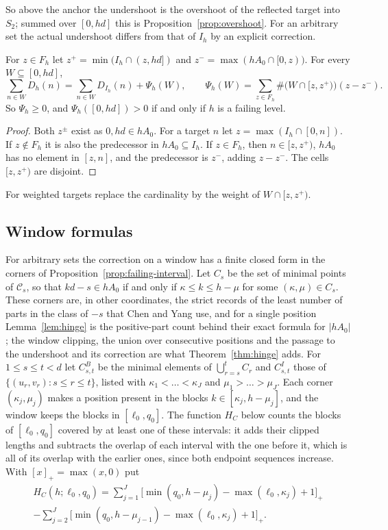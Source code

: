 So above the anchor the undershoot is the overshoot of the reflected target into $S_2$; summed over $[0,hd]$ this is Proposition~\ref{prop:overshoot}. For an arbitrary set the actual undershoot differs from that of $I_h$ by an explicit correction.

\begin{proposition}[Correction]\label{prop:correction}
For $z\in F_h$ let $z^+=\min(I_h\cap(z,hd])$ and $z^-=\max(hA_0\cap[0,z))$. For every $W\subseteq[0,hd]$,
\[
\sum_{n\in W}D_h(n)=\sum_{n\in W}D_{I_h}(n)+\Psi_h(W),\qquad \Psi_h(W)=\sum_{z\in F_h}\#\bigl(W\cap[z,z^+)\bigr)(z-z^-).
\]
So $\Psi_h\ge0$, and $\Psi_h([0,hd])>0$ if and only if $h$ is a failing level.
\end{proposition}

\begin{proof}
Both $z^\pm$ exist as $0,hd\in hA_0$. For a target $n$ let $z=\max(I_h\cap[0,n])$. If $z\notin F_h$ it is also the predecessor in $hA_0\subseteq I_h$. If $z\in F_h$, then $n\in[z,z^+)$, $hA_0$ has no element in $[z,n]$, and the predecessor is $z^-$, adding $z-z^-$. The cells $[z,z^+)$ are disjoint.
\end{proof}

For weighted targets replace the cardinality by the weight of $W\cap[z,z^+)$.

\subsection{Window formulas}\label{subsec:overlap}

For arbitrary sets the correction on a window has a finite closed form in the corners of Proposition~\ref{prop:failing-interval}. Let $C_s$ be the set of minimal points of $\mathcal C_s$, so that $kd-s\in hA_0$ if and only if $\kappa\le k\le h-\mu$ for some $(\kappa,\mu)\in C_s$. These corners are, in other coordinates, the strict records of the least number of parts in the class of $-s$ that Chen and Yang use, and for a single position Lemma~\ref{lem:hinge} is the positive-part count behind their exact formula for $|hA_0|$ \cite[Lemma~2, Thm.~1]{ChenYang2026}; the window clipping, the union over consecutive positions and the passage to the undershoot and its correction are what Theorem~\ref{thm:hinge} adds. For $1\le s\le t<d$ let $C^B_{s,t}$ be the minimal elements of $\bigcup_{r=s}^tC_r$ and $C^I_{s,t}$ those of $\{(u_r,v_r):s\le r\le t\}$, listed with $\kappa_1<\dots<\kappa_J$ and $\mu_1>\dots>\mu_J$. Each corner $(\kappa_j,\mu_j)$ makes a position present in the blocks $k\in[\kappa_j,h-\mu_j]$, and the window keeps the blocks in $[\ell_0,q_0]$. The function $H_C$ below counts the blocks of $[\ell_0,q_0]$ covered by at least one of these intervals: it adds their clipped lengths and subtracts the overlap of each interval with the one before it, which is all of its overlap with the earlier ones, since both endpoint sequences increase. With $[x]_+=\max(x,0)$ put
\begin{multline*}
H_C(h;\ell_0,q_0)=\sum_{j=1}^{J}\bigl[\min(q_0,h-\mu_j)-\max(\ell_0,\kappa_j)+1\bigr]_+\\
-\sum_{j=2}^{J}\bigl[\min(q_0,h-\mu_{j-1})-\max(\ell_0,\kappa_j)+1\bigr]_+ .
\end{multline*}

